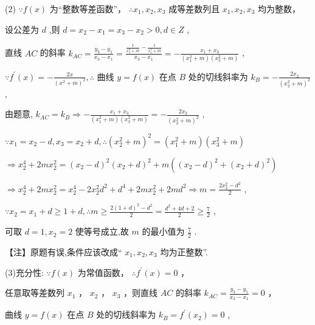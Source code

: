 \documentclass[10pt]{article}
\begin{document}
(2) \(\because f\left( x\right)\) 为“整数等差函数”， \(\therefore {x}_{1},{x}_{2},{x}_{3}\) 成等差数列且 \({x}_{1},{x}_{2},{x}_{3}\) 均为整数，

设公差为 \(d\) ,则 \(d = {x}_{2} - {x}_{1} = {x}_{3} - {x}_{2} > 0,d \in  Z\) ,

直线 \({AC}\) 的斜率 \({k}_{AC} = \frac{{y}_{3} - {y}_{1}}{{x}_{3} - {x}_{1}} = \frac{\frac{1}{{x}_{3}^{2} + m} - \frac{1}{{x}_{1}^{2} + m}}{{x}_{3} - {x}_{1}} =  - \frac{{x}_{1} + {x}_{3}}{\left( {{x}_{1}^{2} + m}\right) \left( {{x}_{3}^{2} + m}\right) }\) ,

\(\because {f}^{\prime }\left( x\right)  =  - \frac{2x}{{\left( {x}^{2} + m\right) }^{2}},\therefore\) 曲线 \(y = f\left( x\right)\) 在点 \(B\) 处的切线斜率为 \({k}_{B} =  - \frac{2{x}_{2}}{{\left( {x}_{2}^{2} + m\right) }^{2}}\) ,

由题意, \({k}_{AC} = {k}_{B} \Rightarrow   - \frac{{x}_{1} + {x}_{3}}{\left( {{x}_{1}^{2} + m}\right) \left( {{x}_{3}^{2} + m}\right) } =  - \frac{2{x}_{2}}{{\left( {x}_{2}^{2} + m\right) }^{2}}\) ,

\(\because {x}_{1} = {x}_{2} - d,{x}_{3} = {x}_{2} + d,\therefore {\left( {x}_{2}^{2} + m\right) }^{2} = \left( {{x}_{1}^{2} + m}\right) \left( {{x}_{3}^{2} + m}\right)\)

\(\Rightarrow  {x}_{2}^{4} + {2m}{x}_{2}^{2} = {\left( {x}_{2} - d\right) }^{2}{\left( {x}_{2} + d\right) }^{2} + m\left( {{\left( {x}_{2} - d\right) }^{2} + {\left( {x}_{2} + d\right) }^{2}}\right)\)

\(\Rightarrow  {x}_{2}^{4} + {2m}{x}_{2}^{2} = {x}_{2}^{4} - 2{x}_{2}^{2}{d}^{2} + {d}^{4} + {2m}{x}_{2}^{2} + {2m}{d}^{2} \Rightarrow  m = \frac{2{x}_{2}^{2} - {d}^{2}}{2}\) ,

\(\because {x}_{2} = {x}_{1} + d \geq  1 + d,\therefore m \geq  \frac{2{\left( 1 + d\right) }^{2} - {d}^{2}}{2} = \frac{{d}^{2} + {4d} + 2}{2} \geq  \frac{7}{2}\) ,

可取 \(d = 1,{x}_{2} = 2\) 使等号成立,故 \(m\) 的最小值为 \(\frac{7}{2}\) .

【注】原题有误,条件应该改成“ \({x}_{1},{x}_{2},{x}_{3}\) 均为正整数”.

(3)充分性: \(\because f\left( x\right)\) 为常值函数， \(\therefore {f}^{\prime }\left( x\right)  = 0\) ，

任意取等差数列 \({x}_{1}\) ， \({x}_{2}\) ， \({x}_{3}\) ，则直线 \({AC}\) 的斜率 \({k}_{AC} = \frac{{y}_{3} - {y}_{1}}{{x}_{3} - {x}_{1}} = 0\) ，

曲线 \(y = f\left( x\right)\) 在点 \(B\) 处的切线斜率为 \({k}_{B} = {f}^{\prime }\left( {x}_{2}\right)  = 0\) ,
\end{document}
